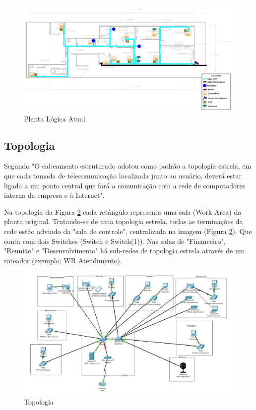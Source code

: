 \documentclass[	DIV=calc,%
							paper=a4,%
							fontsize=12pt,%
							onecolumn]{scrartcl}	 					%
\begin{document}
\begin{figure}[H]
	\centering
	\includegraphics[width=\textwidth]{planta-logica-atual}
	\caption{Planta Lógica Atual}
	\label{planta-logica-atual}
\end{figure}

\subsection{Topologia}

Segundo \cite{senai2012} "O cabeamento estruturado adotou como padrão a topologia estrela, em que
cada tomada de telecomunicação localizada junto ao usuário, deverá estar ligada
a um ponto central que fará a comunicação com a rede de computadores interna
da empresa e à Internet".

Na topologia da Figura \ref{topologia} cada retângulo representa uma sala (Work Area) da planta original. 
Tratando-se de uma topologia estrela, todas as terminações da rede estão advindo da "sala de controle", centralizada na imagem (Figura \ref{topologia}). Que conta com dois Switches (Switch e Switch(1)). Nas salas de "Financeiro", "Reunião" e "Desenvolvimento" há sub-redes de topologia estrela através de um roteador (exemplo: WR$\_$Atendimento).


\begin{figure}[H]
	\centering
	\includegraphics[width=\textwidth]{nova-topologia}
	\caption{Topologia}
	\label{topologia}
\end{figure}
\end{document}
